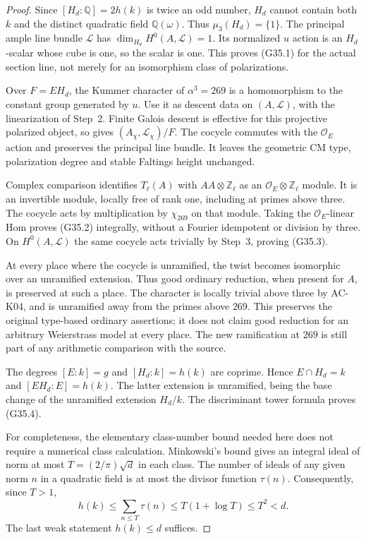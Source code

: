 \begin{proof}
Since $[H_d:\mathbb Q]=2h(k)$ is twice an odd number,
$H_d$ cannot contain both $k$ and the distinct quadratic
field $\mathbb Q(\omega)$.
Thus $\mu_3(H_d)=\{1\}$.
The principal ample line bundle $\mathcal L$ has
$\dim_{H_d}H^0(A,\mathcal L)=1$.
Its normalized $u$ action is an $H_d$-scalar whose cube is one,
so the scalar is one.  This proves (G35.1) for the actual
section line, not merely for an isomorphism class of polarizations.

Over $F=EH_d$, the Kummer character of $\alpha^3=269$
is a homomorphism to the constant group generated by $u$.
Use it as descent data on $(A,\mathcal L)$, with the
linearization of Step~2.  Finite Galois descent is effective
for this projective polarized object, so gives
$(A_\chi,\mathcal L_\chi)/F$.
The cocycle commutes with the $\mathcal O_E$ action and
preserves the principal line bundle.
It leaves the geometric CM type, polarization degree and
stable Faltings height unchanged.

Complex comparison identifies $T_\ell(A)$ with
$AA\otimes\mathbb Z_\ell$ as an
$\mathcal O_E\otimes\mathbb Z_\ell$ module.
It is an invertible module, locally free of rank one,
including at primes above three.
The cocycle acts by multiplication by $\chi_{269}$ on that
module.  Taking the $\mathcal O_E$-linear Hom proves (G35.2)
integrally, without a Fourier idempotent or division by three.
On $H^0(A,\mathcal L)$ the same cocycle acts trivially
by Step~3, proving (G35.3).

At every place where the cocycle is unramified, the twist
becomes isomorphic over an unramified extension.
Thus good ordinary reduction, when present for $A$, is
preserved at such a place.
The character is locally trivial above three by AC-K04,
and is unramified away from the primes above $269$.
This preserves the original type-based ordinary assertions;
it does not claim good reduction for an arbitrary Weierstrass
model at every place.
The new ramification at $269$ is still part of any arithmetic
comparison with the source.

The degrees $[E:k]=g$ and $[H_d:k]=h(k)$ are coprime.
Hence $E\cap H_d=k$ and $[EH_d:E]=h(k)$.
The latter extension is unramified, being the base change
of the unramified extension $H_d/k$.
The discriminant tower formula proves (G35.4).

For completeness, the elementary class-number bound needed
here does not require a numerical class calculation.
Minkowski's bound gives an integral ideal of norm at most
$T=(2/\pi)\sqrt d$ in each class.
The number of ideals of any given norm $n$ in a quadratic
field is at most the divisor function $\tau(n)$.
Consequently, since $T>1$,
\[
 h(k)\le\sum_{n\le T}\tau(n)
       \le T(1+\log T)\le T^2<d.                     \tag{G35.7}
\]
The last weak statement $h(k)\le d$ suffices.


\end{proof}
